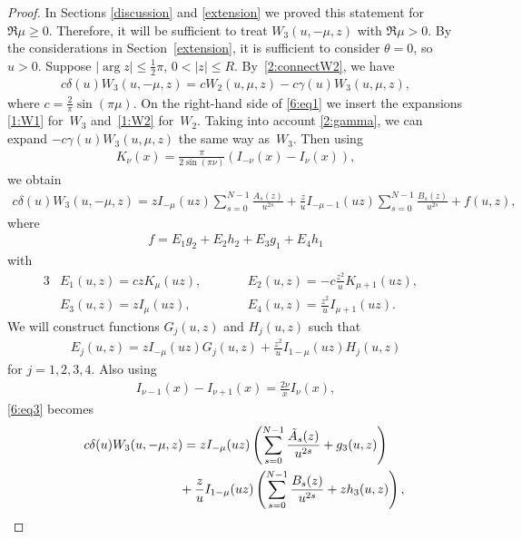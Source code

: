 \documentclass[pdftex]{sigma}
\numberwithin{equation}{section}
\begin{document}
\begin{proof}
In Sections \ref{discussion} and \ref{extension} we proved this statement for $\Re\mu\ge 0$. Therefore, it will be suf\/f\/icient to treat $W_3(u,-\mu,z)$ with $\Re\mu>0$.
By the considerations in Section~\ref{extension}, it is suf\/f\/icient to consider $\theta=0$, so $u>0$.
Suppose $|\arg z|\le \frac12\pi$, $0<|z|\le R$. By~\eqref{2:connectW2}, we have
\begin{gather}\label{6:eq1}
c \delta(u)W_3(u,-\mu,z)=c W_2(u,\mu,z)-c\gamma(u)W_3(u,\mu,z),
\end{gather}
where $c=\frac{2}{\pi}\sin(\pi\mu)$. On the right-hand side of \eqref{6:eq1} we insert the expansions \eqref{1:W1} for~$W_3$ and~\eqref{1:W2} for~$W_2$. Taking into account \eqref{2:gamma}, we can expand $-c\gamma(u)W_3(u,\mu,z)$ the same way as~$W_3$. Then using \cite[(10.27.4)]{NIST}
\begin{gather}\label{6:eq2}
K_\nu(x)=\frac{\pi}{2\sin(\pi\nu)}\left(I_{-\nu}(x)-I_\nu(x)\right),
\end{gather}
we obtain
\begin{gather}\label{6:eq3}
c\delta(u)W_3(u,-\mu,z)=zI_{-\mu}(uz)\sum_{s=0}^{N-1}\frac{A_s(z)}{u^{2s}}+\frac{z}{u}I_{-\mu-1}(uz)\sum_{s=0}^{N-1} \frac{B_s(z)}{u^{2s}}+f(u,z),
\end{gather}
where
\begin{gather*}%
 f=E_1g_2+E_2h_2+E_3g_1+E_4h_1
\end{gather*}
with
\begin{alignat*}{3}
& E_1(u,z) = c zK_\mu(uz),\qquad && E_2(u,z) = -c\frac{z^2}{u} K_{\mu+1}(uz),& \\
& E_3(u,z) = z I_\mu(uz),\qquad && E_4(u,z) = \frac{z^2}{u}I_{\mu+1}(uz) . &
\end{alignat*}
We will construct functions $G_j(u,z)$ and $H_j(u,z)$ such that
\begin{gather*}
E_j(u,z)=z I_{-\mu}(uz) G_j(u,z)+\frac{z^2}{u} I_{1-\mu}(uz) H_j(u,z)
\end{gather*}
for $j=1,2,3,4$.
Also using \cite[(10.29.1)]{NIST}
\begin{gather}\label{6:eq5}
I_{\nu-1}(x)-I_{\nu+1}(x)=\frac{2\nu}{x}I_\nu(x),
\end{gather}
\eqref{6:eq3} becomes
\begin{gather}
c\delta(u)W_3(u,-\mu,z) = zI_{-\mu}(uz)\left(\sum_{s=0}^{N-1} \frac{\tilde A_s(z)}{u^{2s}}+g_3(u,z)\right)\nonumber\\
\hphantom{c\delta(u)W_3(u,-\mu,z) =}{} +\frac{z}{u}I_{1-\mu}(uz)\left(\sum_{s=0}^{N-1} \frac{B_s(z)}{u^{2s}}+zh_3(u,z)\right),\label{6:eq6}

\end{gather}
\end{proof}
\end{document}
